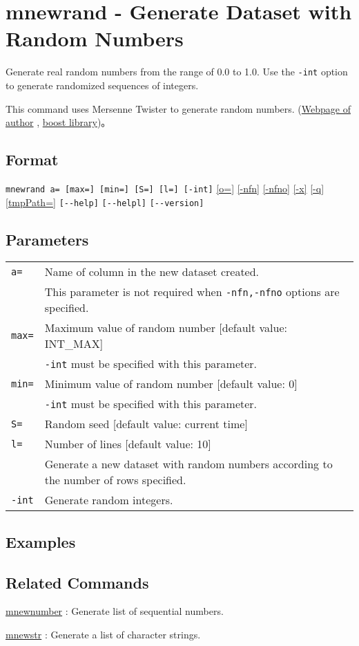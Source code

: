 
%

\section{mnewrand - Generate Dataset with Random Numbers\label{sect:mnewrand}}
Generate real random numbers from the range of 0.0 to 1.0. 
Use the \verb|-int| option to generate randomized sequences of integers.


This command uses Mersenne Twister to generate random numbers. 
(\href{http://www.math.sci.hiroshima-u.ac.jp/~m-mat/MT/emt.html}{Webpage of author}
, \href{http://www.boost.org/doc/libs/1_54_0/doc/html/boost_random.html}{boost library})。


\subsection*{Format}
\verb|mnewrand a= [max=] [min=] [S=] [l=] [-int]|
\hyperref[sect:option_o]{[o=]}
\hyperref[sect:option_nfn]{[-nfn]} 
\hyperref[sect:option_nfno]{[-nfno]}  
\hyperref[sect:option_x]{[-x]}
\hyperref[sect:option_q]{[-q]}
\hyperref[sect:option_option_tmppath]{[tmpPath=]}
\verb|[--help]|
\verb|[--helpl]|
\verb|[--version]|\\

\subsection*{Parameters}
\begin{table}[htbp]
{\small
\begin{tabular}{ll}
\verb|a=|      & Name of column in the new dataset created. \\
               & This parameter is not required when \verb|-nfn,-nfno| options are specified. \\
\verb|max=|    & Maximum value of random number [default value: INT\_MAX]\\
               & \verb|-int| must be specified with this parameter. \\
\verb|min=|    & Minimum value of random number [default value: 0]\\
               &  \verb|-int| must be specified with this parameter. \\
\verb|S=|      & Random seed [default value: current time]\\
\verb|l=|      & Number of lines [default value: 10]\\
               & Generate a new dataset with random numbers according to the number of rows specified. \\
\verb|-int|    & Generate random integers.\\
\end{tabular} 
}
\end{table} 


\subsection*{Examples}


\subsection*{Related Commands}
\hyperref[sect:mnewnumber] {mnewnumber} : Generate list of sequential numbers. 

\hyperref[sect:mnewstr] {mnewstr} : Generate a list of character strings. 

%
